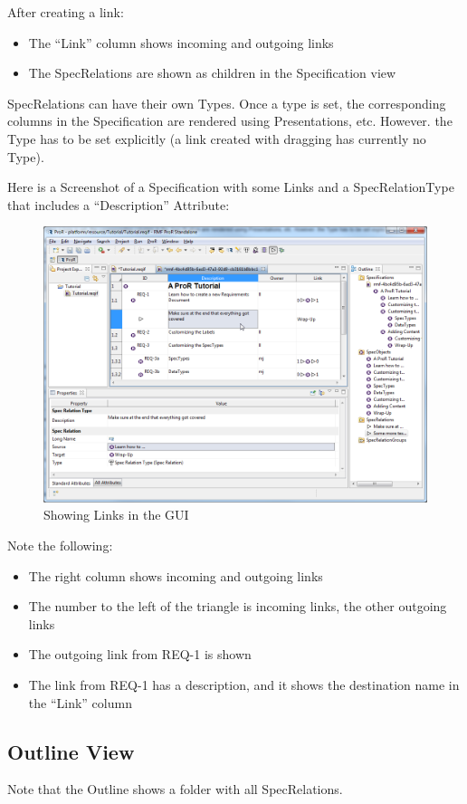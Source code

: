 After creating a link:

\begin{itemize}
\item
  The ``Link'' column shows incoming and outgoing links
\item
  The SpecRelations are shown as children in the Specification view
\end{itemize}

SpecRelations can have their own Types. Once a type is set, the
corresponding columns in the Specification are rendered using
Presentations, etc. However. the Type has to be set explicitly (a link
created with dragging has currently no Type).

Here is a Screenshot of a Specification with some Links and a
SpecRelationType that includes a ``Description'' Attribute:

\begin{figure}[h!]      
\centering      
\includegraphics[width=\linewidth]{../rmf-images/pror_gui_with_links.png}      
\caption{Showing Links in the GUI}      
\label{fig:linksInGui}
\end{figure}

Note the following:

\begin{itemize}
\item
  The right column shows incoming and outgoing links
\item
  The number to the left of the triangle is incoming links, the other
  outgoing links
\item
  The outgoing link from REQ-1 is shown
\item
  The link from REQ-1 has a description, and it shows the destination
  name in the ``Link'' column
\end{itemize}

\subsection{Outline View}

Note that the Outline shows a folder with all SpecRelations.

